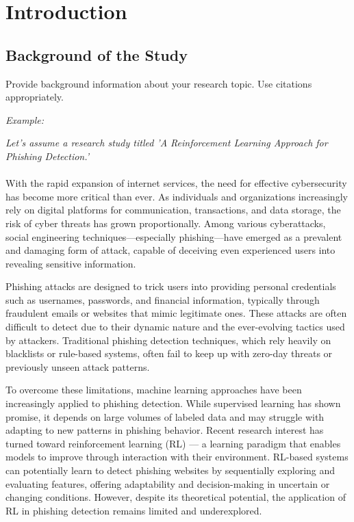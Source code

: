 \section{Introduction}

\subsection{Background of the Study}
Provide background information about your research topic. Use citations appropriately. 

\textit{Example:}

\textit{Let's assume a research study titled 'A Reinforcement Learning Approach for Phishing Detection.'} \\ \\
With the rapid expansion of internet services, the need for effective cybersecurity has become more critical than ever. As individuals and organizations increasingly rely on digital platforms for communication, transactions, and data storage, the risk of cyber threats has grown proportionally. Among various cyberattacks, social engineering techniques—especially phishing—have emerged as a prevalent and damaging form of attack, capable of deceiving even experienced users into revealing sensitive information.

Phishing attacks are designed to trick users into providing personal credentials such as usernames, passwords, and financial information, typically through fraudulent emails or websites that mimic legitimate ones. These attacks are often difficult to detect due to their dynamic nature and the ever-evolving tactics used by attackers. Traditional phishing detection techniques, which rely heavily on blacklists or rule-based systems, often fail to keep up with zero-day threats or previously unseen attack patterns.

To overcome these limitations, machine learning approaches have been increasingly applied to phishing detection. While supervised learning has shown promise, it depends on large volumes of labeled data and may struggle with adapting to new patterns in phishing behavior. Recent research interest has turned toward reinforcement learning (RL) — a learning paradigm that enables models to improve through interaction with their environment. RL-based systems can potentially learn to detect phishing websites by sequentially exploring and evaluating features, offering adaptability and decision-making in uncertain or changing conditions. However, despite its theoretical potential, the application of RL in phishing detection remains limited and underexplored.

